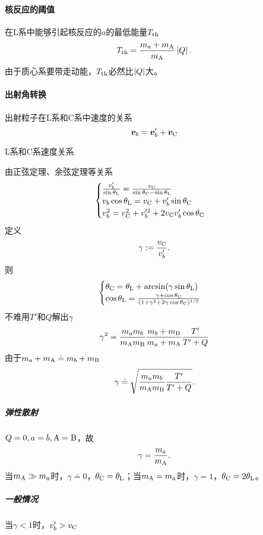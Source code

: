 \paragraph{核反应的阈值}
在L系中能够引起核反应的$a$的最低能量$T_{\mathrm{th}}$
\begin{align}
	T_{\mathrm{th}}=\frac{m_a+m_{\mathrm{A}}}{m_{\mathrm{A}}}\left\lvert Q\right\rvert.
\end{align}
由于质心系要带走动能，$T_{\mathrm{th}}$必然比$\left\lvert Q\right\rvert$大。
\paragraph{出射角转换}
出射粒子在L系和C系中速度的关系
\[
	\bm v_b=\bm v'_b+\bm v_{\mathrm C}
\]
\begin{center}
	\tikzchap L系和C系速度关系
\end{center}
由正弦定理、余弦定理等关系
\[
	\begin{cases}
		\frac{v_b'}{\sin\theta_{\mathrm L}}=\frac{v_{\mathrm C}}{\sin\theta_{\mathrm C}-\sin\theta_{\mathrm L}}\\
		v_b\cos\theta_{\mathrm L}=v_{\mathrm C}+v_b'\sin\theta_{\mathrm C}\\
		v_b^2=v_{\mathrm C}^2+v_b'^2+2v_{\mathrm C} v_b'\cos\theta_{\mathrm C}
	\end{cases}
\]
定义
\begin{align}
	\gamma:=\frac{v_{\mathrm C}}{v_b'}.
\end{align}
则
\begin{align}
	\begin{cases}
		\theta_{\mathrm C}=\theta_{\mathrm L}+\arcsin(\gamma\sin\theta_{\mathrm L})\\
		\cos\theta_{\mathrm L}=\frac{\gamma+\cos\theta_{\mathrm C}}{(1+\gamma^2+2\gamma\cos\theta_{\mathrm C})^{1/2}}
	\end{cases}
\end{align}
不难用$T'$和$Q$解出$\gamma$
\[
	\gamma^2=\frac{m_am_b}{m_{\mathrm{A}}m_{\mathrm{B}}}\frac{m_b+m_{\mathrm{B}}}{m_a+m_{\mathrm{A}}}\frac{T'}{T'+Q}
\]
由于$m_a+m_{\mathrm{A}}\doteq m_b+m_{\mathrm{B}}$
\begin{align}
	\gamma\doteq\sqrt{\frac{m_am_b}{m_{\mathrm{A}}m_{\mathrm{B}}}\frac{T'}{T'+Q}}.
\end{align}
\subparagraph{弹性散射}$Q=0,a=b,\mathrm{A}=\mathrm{B}$，故 
\[
	\gamma=\frac{m_a}{m_{\mathrm{A}}}.
\]
当$m_{\mathrm{A}}\gg m_a$时，$\gamma\doteq 0$，$\theta_{\mathrm C}=\theta_{\mathrm L}$；当$m_{\mathrm{A}}= m_a$时，$\gamma=1$，$\theta_{\mathrm C}=2\theta_{\mathrm L}$。
\subparagraph{一般情况}当$\gamma<1$时，$v_b'>v_{\mathrm C}$

